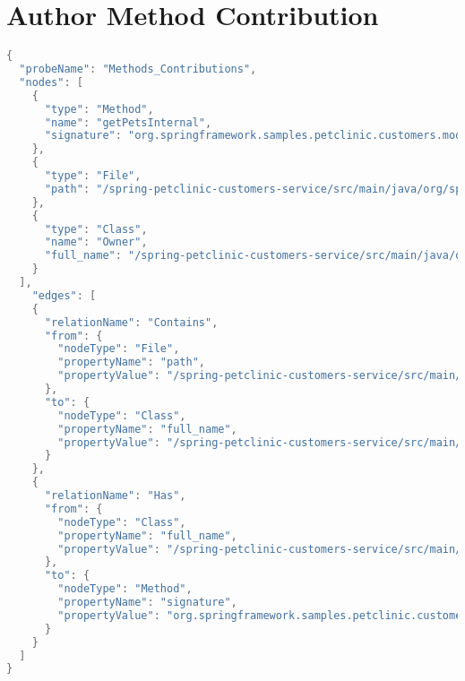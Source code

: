 \section{Author Method Contribution}\label{appendix_sec:author_method_contributions}
\begin{lstlisting}[language=java]
{
  "probeName": "Methods_Contributions",
  "nodes": [
    {
      "type": "Method",
      "name": "getPetsInternal",
      "signature": "org.springframework.samples.petclinic.customers.model.Owner.getPetsInternal()"
    },
    {
      "type": "File",
      "path": "/spring-petclinic-customers-service/src/main/java/org/springframework/samples/petclinic/customers/model/Owner.java"
    },
    {
      "type": "Class",
      "name": "Owner",
      "full_name": "/spring-petclinic-customers-service/src/main/java/org/springframework/samples/petclinic/customers/model/Owner.java:Owner"
    }
  ],
    "edges": [
    {
      "relationName": "Contains",
      "from": {
        "nodeType": "File",
        "propertyName": "path",
        "propertyValue": "/spring-petclinic-customers-service/src/main/java/org/springframework/samples/petclinic/customers/model/Owner.java"
      },
      "to": {
        "nodeType": "Class",
        "propertyName": "full_name",
        "propertyValue": "/spring-petclinic-customers-service/src/main/java/org/springframework/samples/petclinic/customers/model/Owner.java:Owner"
      }
    },
    {
      "relationName": "Has",
      "from": {
        "nodeType": "Class",
        "propertyName": "full_name",
        "propertyValue": "/spring-petclinic-customers-service/src/main/java/org/springframework/samples/petclinic/customers/model/Owner.java:Owner"
      },
      "to": {
        "nodeType": "Method",
        "propertyName": "signature",
        "propertyValue": "org.springframework.samples.petclinic.customers.model.Owner.getPetsInternal()"
      }
    }
  ]
}
\end{lstlisting}

